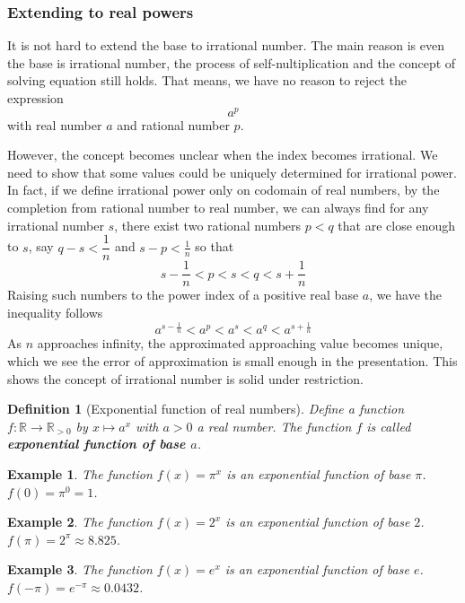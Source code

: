 \documentclass[12pt]{article}
\newtheorem{definition}{Definition}[section]
\newtheorem*{example}{Example}
\begin{document}
    \subsubsection*{Extending to real powers}

    It is not hard to extend the base to irrational number. The main reason is even the base is irrational number, the process of self-nultiplication and the concept of solving equation still holds. That means, we have no reason to reject the expression $$a^p$$ with real number $a$ and rational number $p$.
    
    However, the concept becomes unclear when the index becomes irrational. We need to show that some values could be uniquely determined for irrational power. In fact, if we define irrational power only on codomain of real numbers, by the completion from rational number to real number, we can always find for any irrational number $s$, there exist two rational numbers $p<q$ that are close enough to $s$, say $q-s<\dfrac{1}{n}$ and $s-p<\frac{1}{n}$ so that $$s-\frac{1}{n}<p<s<q<s+\frac{1}{n}$$
    Raising such numbers to the power index of a positive real base $a$, we have the inequality follows $$a^{s-\frac{1}{n}}<a^p<a^s<a^q<a^{s+\frac{1}{n}}$$
    As $n$ approaches infinity, the approximated approaching value becomes unique, which we see the error of approximation is small enough in the presentation. This shows the concept of irrational number is solid under restriction.

    \begin{definition}[Exponential function of real numbers]
        Define a function $f:\mathbb{R}\to\mathbb{R}_{>0}$ by $x\mapsto a^x$ with $a>0$ a real number. The function $f$ is called \textbf{exponential function of base $a$}.
    \end{definition}

    \begin{example}
        The function $f(x)=\pi^x$ is an exponential function of base $\pi$. $f(0)=\pi^0=1$.
    \end{example}

    \begin{example}
        The function $f(x)=2^x$ is an exponential function of base $2$. $f(\pi)=2^\pi\approx 8.825$.
    \end{example}

    \begin{example}
        The function $f(x)=e^x$ is an exponential function of base $e$. $f(-\pi)=e^{-\pi}\approx 0.0432$.
    \end{example}
\end{document}
